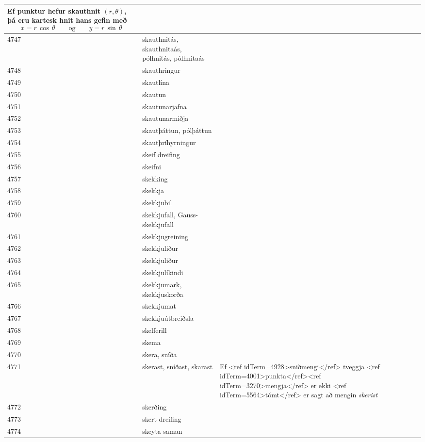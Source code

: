 \begin{longtable}{p{}|p{}|p{}|p{}|p{}}
Ef punktur hefur skauthnit $(r,\theta)$, þá eru kartesk hnit hans gefin með \[ x=r\,\cos\,\theta\qquad\text{og}\qquad y=r\,\sin\,\theta \] & \\
\hline
4747 & skauthnitás, skauthnitaás, pólhnitás, pólhnitaás &  &  &  \\
\hline
4748 & skauthringur &  &  &  \\
\hline
4749 & skautlína &  &  &  \\
\hline
4750 & skautun &  &  &  \\
\hline
4751 & skautunarjafna &  &  &  \\
\hline
4752 & skautunarmiðja &  &  &  \\
\hline
4753 & skautþáttun, pólþáttun &  &  &  \\
\hline
4754 & skautþríhyrningur &  &  &  \\
\hline
4755 & skeif dreifing &  &  &  \\
\hline
4756 & skeifni &  &  &  \\
\hline
4757 & skekking &  &  &  \\
\hline
4758 & skekkja &  &  &  \\
\hline
4759 & skekkjubil &  &  &  \\
\hline
4760 & skekkjufall, Gauss-skekkjufall &  &  &  \\
\hline
4761 & skekkjugreining &  &  &  \\
\hline
4762 & skekkjuliður &  &  &  \\
\hline
4763 & skekkjuliður &  &  &  \\
\hline
4764 & skekkjulíkindi &  &  &  \\
\hline
4765 & skekkjumark, skekkjuskorða &  &  &  \\
\hline
4766 & skekkjumat &  &  &  \\
\hline
4767 & skekkjuútbreiðsla &  &  &  \\
\hline
4768 & skelferill &  &  &  \\
\hline
4769 & skema &  &  &  \\
\hline
4770 & skera, sníða &  &  &  \\
\hline
4771 & skerast, sníðast, skarast & Ef <ref idTerm=4928>sniðmengi</ref> tveggja <ref idTerm=4001>punkta</ref><ref idTerm=3270>mengja</ref> er ekki <ref idTerm=5564>tómt</ref> er sagt að mengin \textit{skerist} &  &  \\
\hline
4772 & skerðing &  &  &  \\
\hline
4773 & skert dreifing &  &  &  \\
\hline
4774 & skeyta saman &  &  &  \\

\end{longtable}
